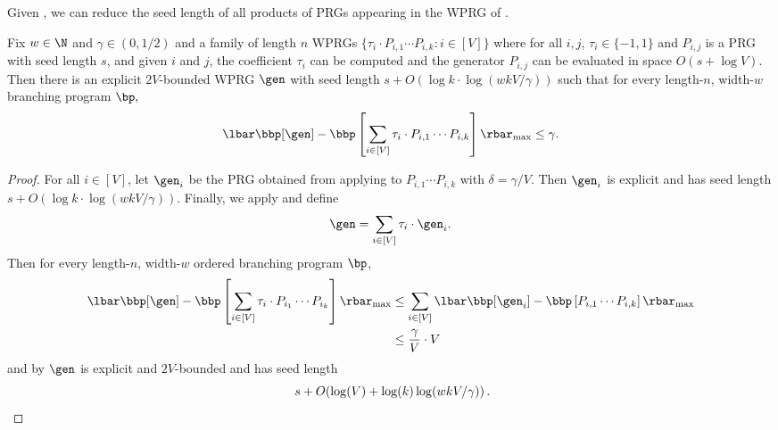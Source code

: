 Given , we can reduce the seed length of all products of PRGs appearing in the WPRG of .
\begin{corollary}\label{cor:pathInner}
Fix $w \in \N$ and $\gamma \in (0,1/2)$ and a family of length $n$ WPRGs $\{\tau_i\cdot P_{i,1}\cdots P_{i,k}:i\in[V]\}$ where for all $i,j$, $\tau_i\in \{-1,1\}$ and $P_{i,j}$ is a PRG with seed length $s$, and given $i$ and $j$, the coefficient $\tau_i$ can be computed and the generator $P_{i,j}$ can be evaluated in space $O(s+\log V)$. Then there is an explicit $2V$-bounded WPRG $\gen$ with seed length $s+O(\log k\cdot \log(wkV/\gamma))$ such that for every length-$n$, width-$w$ branching program $\bp,$
$$\lbar\bbp[\gen] - \bbp\left[\sum_{i\in [V]}\tau_i\cdot P_{i,1}\cdots P_{i,k}\right]\rbar_{\max}\leq \gamma.$$
\end{corollary}
\begin{proof}
For all $i\in [V]$, let $\gen_i$ be the PRG obtained from applying  to $P_{i,1}\cdots P_{i,k}$ with $\delta=\gamma/V$. Then $\gen_i$ is explicit and has seed length $s+O(\log k\cdot\log(wkV/\gamma))$.
Finally, we apply  and define
$$\gen=\sum_{i\in [V]} \tau_i\cdot \gen_i.$$ 
Then for every length-$n$, width-$w$ ordered branching program $\bp$,
\begin{align*}
    \lbar\bbp[\gen] - \bbp\left[\sum_{i\in [V]}\tau_i\cdot P_{i_1}\cdots P_{i_k}\right]\rbar_{\max} &\leq  \sum_{i\in [V]}\lbar \bbp[\gen_i] - \bbp\left[P_{i,1}\cdots P_{i,k}\right] \rbar_{\max}\\
    &\leq \frac{\gamma}{V}\cdot V
\end{align*}
and by  $\gen$ is explicit and $2V$-bounded and has seed length
%
\[\ s+O(\log(V)+\log(k)\log(wkV/\gamma))\,.   \qedhere  \]
%
\end{proof}

